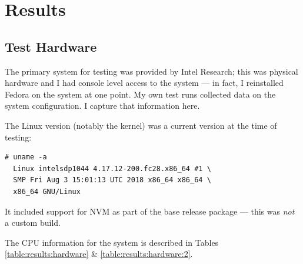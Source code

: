 
\chapter{Results}
\label{ch:Results}

\section{Test Hardware}

The primary system for testing was provided by Intel Research; this was physical hardware
and I had console level access to the system --- in fact, I reinstalled Fedora on the
system at one point.  My own test runs collected data on the system configuration.  I
capture that information here.

The Linux version (notably the kernel) was a current version at the time of testing:

\begin{verbatim}
# uname -a
  Linux intelsdp1044 4.17.12-200.fc28.x86_64 #1 \
  SMP Fri Aug 3 15:01:13 UTC 2018 x86_64 x86_64 \
  x86_64 GNU/Linux
\end{verbatim}

It included support for NVM as part of the base release package --- this was \textit{not}
a custom build.

The CPU information for the system is described in Tables \ref{table:results:hardware} \& \ref{table:results:hardware:2}.

